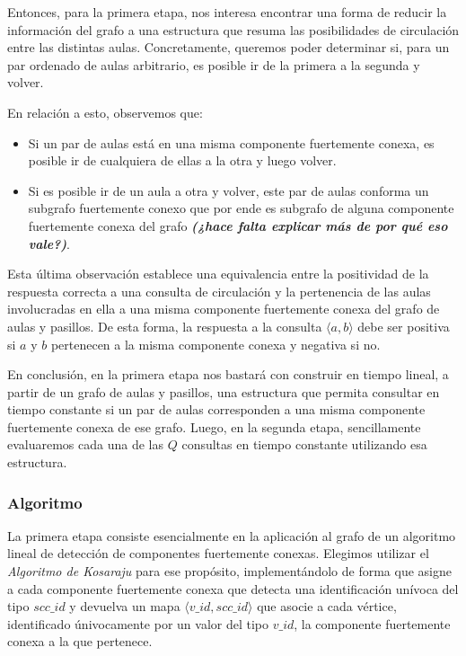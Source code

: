 Entonces, para la primera etapa, nos interesa encontrar una forma de reducir la información del grafo a una estructura que resuma las posibilidades de circulación entre las distintas aulas. Concretamente, queremos poder determinar si, para un par ordenado de aulas arbitrario, es posible ir de la primera a la segunda y volver.

En relación a esto, observemos que:
\begin{itemize}
    \item Si un par de aulas está en una misma componente fuertemente conexa, es posible ir de cualquiera de ellas a la otra y luego volver.
    \item Si es posible ir de un aula a otra y volver, este par de aulas conforma un subgrafo fuertemente conexo que por ende es subgrafo de alguna componente fuertemente conexa del grafo \textit{\textbf{(¿hace falta explicar más de por qué eso vale?)}}.
\end{itemize}

Esta última observación establece una equivalencia entre la positividad de la respuesta correcta a una consulta de circulación y la pertenencia de las aulas involucradas en ella a una misma componente fuertemente conexa del grafo de aulas y pasillos. De esta forma, la respuesta a la consulta $\langle a,b \rangle$ debe ser positiva si $a$ y $b$ pertenecen a la misma componente conexa y negativa si no.

En conclusión, en la primera etapa nos bastará con construir en tiempo lineal, a partir de un grafo de aulas y pasillos, una estructura que permita consultar en tiempo constante si un par de aulas corresponden a una misma componente fuertemente conexa de ese grafo. Luego, en la segunda etapa, sencillamente evaluaremos cada una de las $Q$ consultas en tiempo constante utilizando esa estructura.

\subsubsection{Algoritmo}

La primera etapa consiste esencialmente en la aplicación al grafo de un algoritmo lineal de detección de componentes fuertemente conexas. Elegimos utilizar el \textit{Algoritmo de Kosaraju} para ese propósito, implementándolo de forma que asigne a cada componente fuertemente conexa que detecta una identificación unívoca del tipo $scc\_id$ y devuelva un mapa $\langle v\_id, scc\_id \rangle$ que asocie a cada vértice, identificado únivocamente por un valor del tipo $v\_id$, la componente fuertemente conexa a la que pertenece.

